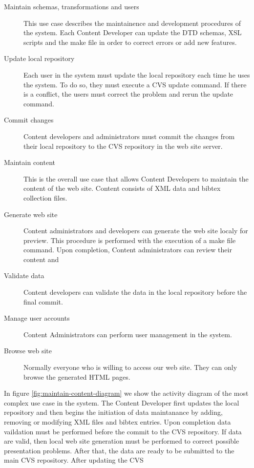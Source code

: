 \documentclass[10pt]{article}
\begin{document}
\begin{description}
\item[Maintain schemas, transformations and users] This use case describes the maintainence and development
 procedures of the system. Each Content Developer can update the DTD schemas, XSL scripts and the make file 
 in order to correct errors or add new features.

\item[Update local repository] Each user in the system must update the local repository each time he uses the system. 
To do so, they must execute a CVS update command. If there is a conflict, the users must correct the problem and rerun the
update command.

\item[Commit changes] Content developers and administrators must commit the changes from their local repository 
to the CVS repository in the web site server.

\item[Maintain content] This is the overall use case that allows Content Developers to maintain the content of the web site. 
Content consists of XML data and bibtex collection files.

\item[Generate web site] Content administrators and developers can generate the web site localy for preview. This procedure is 
performed with the execution of a make file command. Upon completion, Content administrators can review their content and   

\item[Validate data] Content developers can validate the data in the local repository before the final commit.

\item[Manage user accounts] Content Administrators can perform user management in the system. 

\item[Browse web site] Normally everyone who is willing to access our web site. They can only browse the generated {\sc HTML} pages.

\end{description} 

In figure \ref{fig:maintain-content-diagram} we show the activity diagram of the most complex use case in the system. The Content Developer first updates the local repository and then begins the initiation of data maintanance by adding, removing or modifying XML files and bibtex entries. Upon completion data vaildation must be performed before the commit to the CVS repository. If data are valid, then local web site generation must be performed to correct possible presentation problems. After that, the data are ready to be submitted to the main CVS repository. After updating the CVS 
\end{document}
